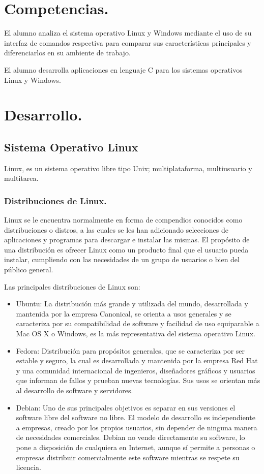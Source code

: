 \documentclass[12pt]{article}
\begin{document}
	\tableofcontents
    \newpage
    
\section{Competencias.}
El alumno analiza el sistema operativo Linux y Windows mediante el uso de su interfaz de comandos respectiva para comparar sus características principales y diferenciarlos en su ambiente de trabajo.

El alumno desarrolla aplicaciones en lenguaje C para los sistemas operativos Linux y Windows.

\section{Desarrollo.}
\subsection{ Sistema Operativo Linux}
Linux, es un sistema operativo libre tipo Unix; multiplataforma, multiusuario y multitarea. 
\subsubsection{Distribuciones de Linux.}
Linux se le encuentra normalmente en forma de compendios conocidos como distribuciones o distros, a las cuales se les han adicionado selecciones de aplicaciones y programas para descargar e instalar las mismas. El propósito de una distribución es ofrecer Linux como un producto final que el usuario pueda instalar, cumpliendo con las necesidades de un grupo de usuarios o bien del público general.

Las principales distribuciones de Linux son: 
\begin{itemize}
    \item {Ubuntu: La distribución más grande y utilizada del mundo, desarrollada y mantenida por la empresa Canonical, se orienta a usos generales y se caracteriza por su compatibilidad de software y facilidad de uso equiparable a Mac OS X o Windows, es la más representativa del sistema operativo Linux.}
    \item {Fedora: Distribución para propósitos generales, que se caracteriza por ser estable y seguro, la cual es desarrollada y mantenida por la empresa Red Hat y una comunidad internacional de ingenieros, diseñadores gráficos y usuarios que informan de fallos y prueban nuevas tecnologías. Sus usos se orientan más al desarrollo de software y servidores.}
    \item{ Debian: Uno de sus principales objetivos es separar en sus versiones el software libre del software no libre. El modelo de desarrollo es independiente a empresas, creado por los propios usuarios, sin depender de ninguna manera de necesidades comerciales. Debian no vende directamente su software, lo pone a disposición de cualquiera en Internet, aunque sí permite a personas o empresas distribuir comercialmente este software mientras se respete su licencia.}
\end{itemize}
\newpage
\end{document}
